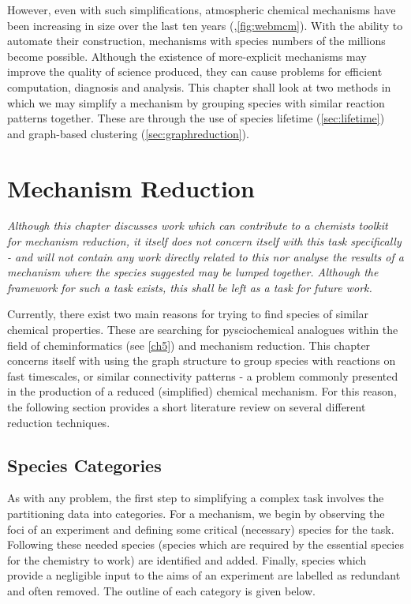 However, even with such simplifications, atmospheric chemical mechanisms have been increasing in size over the last ten years (\citep{defra1},\autoref{fig:webmcm}). With the ability to automate their construction, mechanisms with species numbers of the millions become possible. Although the existence of more-explicit mechanisms may improve the quality of science produced, they can cause problems for efficient computation, diagnosis and analysis. This chapter shall look at two methods in which we may simplify a mechanism by grouping species with similar reaction patterns together. These are through the use of species lifetime (\autoref{sec:lifetime}) and graph-based clustering (\autoref{sec:graphreduction}).




\section{Mechanism Reduction}

\textit{Although this chapter discusses work which can contribute to a chemists toolkit for mechanism reduction, it itself does not concern itself with this task specifically - and will not contain any work directly related to this nor analyse the results of a mechanism where the species suggested may be lumped together. Although the framework for such a task exists, this shall be left as a task for future work.  }

Currently, there exist two main reasons for trying to find species of similar chemical properties. These are searching for pysciochemical analogues within the field of cheminformatics (see \autoref{ch5}) and mechanism reduction. This chapter concerns itself with using the graph structure to group species with reactions on fast timescales, or similar connectivity patterns - a problem commonly presented in the production of a reduced (simplified) chemical mechanism. For this reason, the following section provides a short literature review on several different reduction techniques.

\subsection{Species Categories}

As with any problem, the first step to simplifying a complex task involves the partitioning data into categories. For a mechanism, we begin by observing the foci of an experiment and defining some critical (necessary) species for the task. Following these needed species (species which are required by the essential species for the chemistry to work) are identified and added. Finally, species which provide a negligible input to the aims of an experiment are labelled as redundant and often removed.  The outline of each category is given below.


